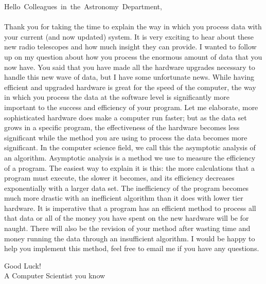 \documentclass[12pt]{article}
\begin{document}
\newpage
\mbox{Hello Colleagues in the Astronomy Department,}
\\ \\ Thank you for taking the time to explain the way in which you process data with your current (and now updated) system. It is very exciting to hear about these new radio telescopes and how much insight they can provide. I wanted to follow up on my question about how you process the enormous amount of data that you now have. You said that you have made all the hardware upgrades necessary to handle this new wave of data, but I have some unfortunate news. While having efficient and upgraded hardware is great for the speed of the computer, the way in which you process the data at the software level is significantly more important to the success and efficiency of your program. Let me elaborate, more sophisticated hardware does make a computer run faster; but as the data set grows in a specific program, the effectiveness of the hardware becomes less significant while the method you are using to process the data becomes more significant. In the computer science field, we call this the asymptotic analysis of an algorithm. Asymptotic analysis is a method we use to measure the efficiency of a program. The easiest way to explain it is this: the more calculations that a program must execute, the slower it becomes, and its efficiency decreases exponentially with a larger data set. The inefficiency of the program becomes much more drastic with an inefficient algorithm than it does with lower tier hardware. It is imperative that a program has an efficient method to process all that data or all of the money you have spent on the new hardware will be for naught. There will also be the revision of your method after wasting time and money running the data through an insufficient algorithm. I would be happy to help you implement this method, feel free to email me if you have any questions.

Good Luck!
\\ A Computer Scientist you know

\newpage
\pagebreak
\end{document}
